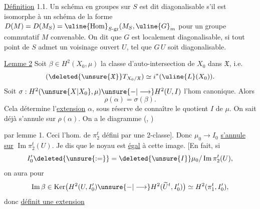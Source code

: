 \uline{Définition} 1.1. Un schéma en groupes  sur $S$ est dit diagonalisable
s'il est isomorphe à un schéma de la forme 
$D(M)=D(M_S)=\uline{\operatorname{Hom}}_{S\text{-gr}}(M_S,\uline{G}_m$
pour un groupe commutatif $M$ convenable. On dit que $G$ est localement
diagonalisable, si tout point de $S$ admet un voisinage ouvert $U$, tel que
$G\,U$ soit diagonalisable.


\uline{Lemme 2} Soit $\beta\in H^2(X_0,\mu)$ la classe d'auto-intersection
de $X_0$ dans $\mathfrak X$, i.e.
\[
(\deleted{\unsure{\mathfrak X}}T_{X_0/\mathfrak X})
\simeq i^*(\uline{L}(X_0)).
\]
Soit $\sigma:H^2(\unsure{X|X_0},\mu)\unsure{-|\longrightarrow}H^2(U,I)$
l'hom canonique.
Alors
\[
\rho(\alpha)=\sigma(\beta).
\]
Cela détermine l'\uline{extension} $\alpha$, sous
réserve de connaître le quotient $I$ de $\mu$.
On sait déjà 
\deleted{\unsure{$\rho\beta$}}
s'annule sur $\rho(\alpha)$. On a le diagramme
(, )

par lemme 1. Ceci  l'hom.
 de $\pi_2^t$ défini par une 2-classe].
Donc 
$\mu_0\longrightarrow I_0$ \uline{s'annule sur}
$\operatorname{Im}\pi_2^t(U)$. Je dis que 
le noyau est \uline{égal} à cette image.
[En fait, si
\[
I'_0\deleted{\unsure{:=}}=\deleted{\unsure{I}}
\mu_0/\operatorname{Im}\pi_2^t(U),
\]
on aura pour
\[
\operatorname{Im}\beta\in
\operatorname{Ker}\bigl(H^2(U,I'_0)\unsure{-|\longrightarrow}
H^2(\widetilde U^t,I'_0)\bigr)
\simeq H^2(\pi_1^t,I'_0),
\]
donc 
\uline{définit une extension}


